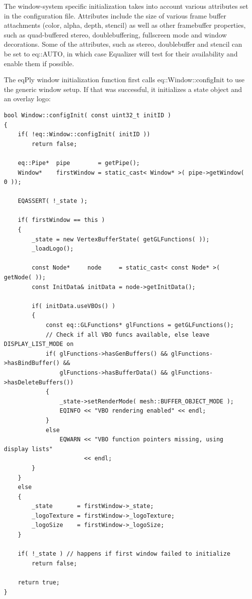\documentclass[10pt,a4]{scrartcl}
\begin{document}
The window-system specific initialization takes into account various
attributes set in the configuration file. Attributes include the size of
various frame buffer attachments (color, alpha, depth, stencil) as well
as other framebuffer properties, such as quad-buffered stereo,
doublebuffering, fullscreen mode and window decorations. Some of the
attributes, such as stereo, doublebuffer and stencil can be set to
\textsf{eq::AUTO}, in which case Equalizer will test for their availability and 
enable them if possible.

The \textsf{eqPly} window initialization function first calls
\textsf{eq::Window::configInit} to use the generic window setup. If that
was successful, it initializes a state object and an overlay logo:

{\footnotesize\begin{lstlisting}
bool Window::configInit( const uint32_t initID )
{
    if( !eq::Window::configInit( initID ))
        return false;

    eq::Pipe*  pipe        = getPipe();
    Window*    firstWindow = static_cast< Window* >( pipe->getWindow( 0 ));

    EQASSERT( !_state );

    if( firstWindow == this )
    {
        _state = new VertexBufferState( getGLFunctions( ));
        _loadLogo();

        const Node*     node     = static_cast< const Node* >( getNode( ));
        const InitData& initData = node->getInitData();

        if( initData.useVBOs() )
        {
            const eq::GLFunctions* glFunctions = getGLFunctions();
            // Check if all VBO funcs available, else leave DISPLAY_LIST_MODE on
            if( glFunctions->hasGenBuffers() && glFunctions->hasBindBuffer() &&
                glFunctions->hasBufferData() && glFunctions->hasDeleteBuffers())
            {
                _state->setRenderMode( mesh::BUFFER_OBJECT_MODE );
                EQINFO << "VBO rendering enabled" << endl;
            }
            else
                EQWARN << "VBO function pointers missing, using display lists" 
                       << endl;
        }
    }
    else
    {
        _state       = firstWindow->_state;
        _logoTexture = firstWindow->_logoTexture;
        _logoSize    = firstWindow->_logoSize;
    }

    if( !_state ) // happens if first window failed to initialize
        return false;
    
    return true;
}
\end{lstlisting}}%
\end{document}
